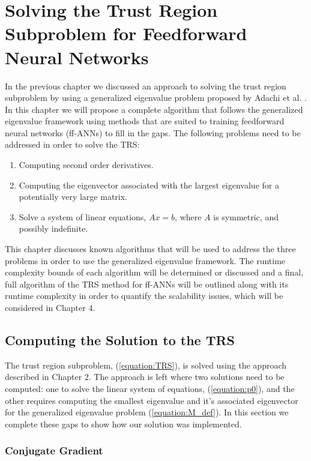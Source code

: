 \documentclass[letterpaper,12pt,titlepage,oneside,final]{book}
\begin{document}
	\chapter{Solving the Trust Region Subproblem for Feedforward Neural Networks}
	In the previous chapter we discussed an approach to solving the trust region subproblem by using a generalized eigenvalue problem proposed by Adachi et al. \cite{adachi.paper}. In this chapter we will propose a complete algorithm that follows the generalized eigenvalue framework using methods that are suited to training feedforward neural networks (ff-ANNs) to fill in the gaps. The following problems need to be addressed in order to solve the TRS:
	\begin{enumerate}
		\item Computing second order derivatives.
		\item Computing the eigenvector associated with the largest eigenvalue for a potentially very large matrix.
		\item Solve a system of linear equations, $Ax=b$, where $A$ is symmetric, and possibly indefinite. 
	\end{enumerate}
	This chapter discusses known algorithms that will be used to address the three problems in order to use the generalized eigenvalue framework. The runtime complexity bounds of each algorithm will be determined or discussed and a final, full algorithm of the TRS method for ff-ANNs will be outlined along with its runtime complexity in order to quantify the scalability issues, which will be considered in Chapter 4.
	
	
	\section{Computing the Solution to the TRS}
	
	The trust region subproblem, (\ref{equation:TRS}), is solved using the approach described in Chapter 2. The approach is left where two solutions need to be computed: one to solve the linear system of equations, (\ref{equation:p0}), and the other requires computing the smallest eigenvalue and it's associated eigenvector for the generalized eigenvalue problem (\ref{equation:M_def}). In this section we complete these gaps to show how our solution was implemented.
	
	\subsection{Conjugate Gradient}
	
\end{document}
